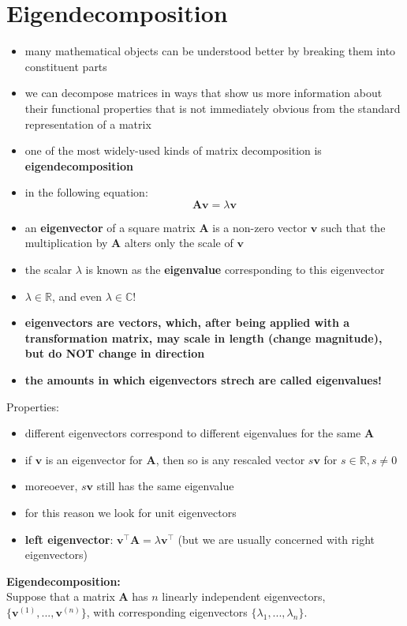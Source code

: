 \documentclass[11pt,twocolumn]{report}
\def\realnumbers{\mathbb{R}}
\def\complexnumbers{\mathbb{C}}
\begin{document}
\section{Eigendecomposition}
\begin{itemize}
  \item many mathematical objects can be understood better by breaking them
    into constituent parts
  \item we can decompose matrices in ways that show us more information about
    their functional properties that is not immediately obvious from the
    standard representation of a matrix
  \item one of the most widely-used kinds of matrix decomposition is
    \textbf{eigendecomposition}
  \item in the following equation:
    \begin{equation}
      \label{eigendecomposition}
      \bm{Av} = \lambda\bm{v}
    \end{equation}
  \item an \textbf{eigenvector} of a square matrix $\bm{A}$ is a non-zero
    vector $\bm{v}$ such that the multiplication by $\bm{A}$ alters only the
    scale of $\bm{v}$
  \item the scalar $\lambda$ is known as the \textbf{eigenvalue} corresponding
    to this eigenvector
  \item $\lambda \in \realnumbers$, and even $\lambda \in \complexnumbers$!
  \item \textbf{eigenvectors are vectors, which, after being applied with a
      transformation matrix, may scale in length (change magnitude), but do NOT
      change in direction}
  \item \textbf{the amounts in which eigenvectors strech are called eigenvalues!}
\end{itemize}
Properties:
\begin{itemize}
  \item different eigenvectors correspond to different eigenvalues for the same
    $\bm{A}$
  \item if $\bm{v}$ is an eigenvector for $\bm{A}$, then so is any rescaled
    vector $s\bm{v}$ for $s \in \realnumbers, s \neq 0$
  \item moreoever, $s\bm{v}$ still has the same eigenvalue
  \item for this reason we look for unit eigenvectors
  \item \textbf{left eigenvector}: $\bm{v}^\intercal\bm{A} =
    \lambda\bm{v}^\intercal$ (but we are usually concerned with right
    eigenvectors)
\end{itemize}
\textbf{Eigendecomposition:}\\
Suppose that a matrix $\bm{A}$ has $n$ linearly independent eigenvectors,
$\{\bm{v}^{(1)},...,\bm{v}^{(n)}\}$, with corresponding eigenvectors
$\{\lambda_1,...,\lambda_n\}$.
\end{document}
